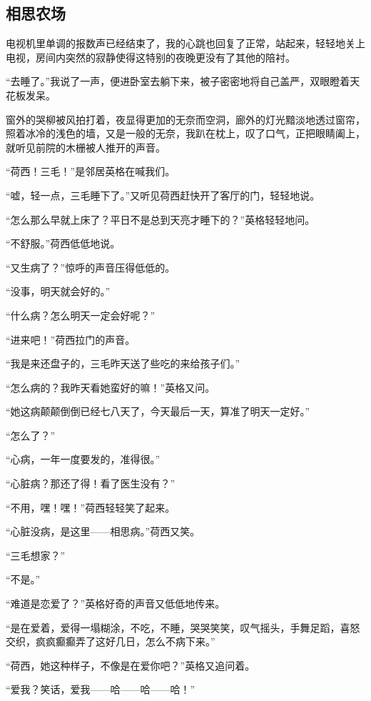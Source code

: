 \subsection{相思农场}


\par 电视机里单调的报数声已经结束了，我的心跳也回复了正常，站起来，轻轻地关上电视，房间内突然的寂静使得这特别的夜晚更没有了其他的陪衬。
\par “去睡了。”我说了一声，便进卧室去躺下来，被子密密地将自己盖严，双眼瞪着天花板发呆。
\par 窗外的哭柳被风拍打着，夜显得更加的无奈而空洞，廊外的灯光黯淡地透过窗帘，照着冰冷的浅色的墙，又是一般的无奈，我趴在枕上，叹了口气，正把眼睛阖上，就听见前院的木栅被人推开的声音。
\par “荷西！三毛！”是邻居英格在喊我们。
\par “嘘，轻一点，三毛睡下了。”又听见荷西赶快开了客厅的门，轻轻地说。
\par “怎么那么早就上床了？平日不是总到天亮才睡下的？”英格轻轻地问。
\par “不舒服。”荷西低低地说。
\par “又生病了？”惊呼的声音压得低低的。
\par “没事，明天就会好的。”
\par “什么病？怎么明天一定会好呢？”
\par “进来吧！”荷西拉门的声音。
\par “我是来还盘子的，三毛昨天送了些吃的来给孩子们。”
\par “怎么病的？我昨天看她蛮好的嘛！”英格又问。
\par “她这病颠颠倒倒已经七八天了，今天最后一天，算准了明天一定好。”
\par “怎么了？”
\par “心病，一年一度要发的，准得很。”
\par “心脏病？那还了得！看了医生没有？”
\par “不用，嘿！嘿！”荷西轻轻笑了起来。
\par “心脏没病，是这里——相思病。”荷西又笑。
\par “三毛想家？”
\par “不是。”
\par “难道是恋爱了？”英格好奇的声音又低低地传来。
\par “是在爱着，爱得一塌糊涂，不吃，不睡，哭哭笑笑，叹气摇头，手舞足蹈，喜怒交织，疯疯癫癫弄了这好几日，怎么不病下来。”
\par “荷西，她这种样子，不像是在爱你吧？”英格又追问着。
\par “爱我？笑话，爱我——哈——哈——哈！”

